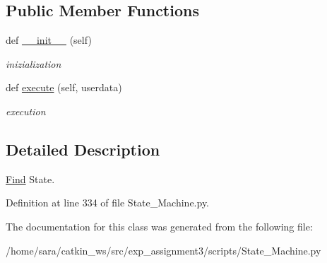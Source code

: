 \subsection*{Public Member Functions}
\begin{DoxyCompactItemize}
\item 
\mbox{\label{classState__Machine_1_1Find_adacf0aacee7f880be6d8611f3692f258}} 
def \hyperlink{classState__Machine_1_1Find_adacf0aacee7f880be6d8611f3692f258}{\+\_\+\+\_\+init\+\_\+\+\_\+} (self)
\begin{DoxyCompactList}\small\item\em inizialization \end{DoxyCompactList}\item 
\mbox{\label{classState__Machine_1_1Find_a492e549177cf32a2aa5e715bfd66db53}} 
def \hyperlink{classState__Machine_1_1Find_a492e549177cf32a2aa5e715bfd66db53}{execute} (self, userdata)
\begin{DoxyCompactList}\small\item\em execution \end{DoxyCompactList}\end{DoxyCompactItemize}


\subsection{Detailed Description}
\hyperlink{classState__Machine_1_1Find}{Find} State. 

Definition at line 334 of file State\+\_\+\+Machine.\+py.



The documentation for this class was generated from the following file\+:\begin{DoxyCompactItemize}
\item 
/home/sara/catkin\+\_\+ws/src/exp\+\_\+assignment3/scripts/State\+\_\+\+Machine.\+py\end{DoxyCompactItemize}
